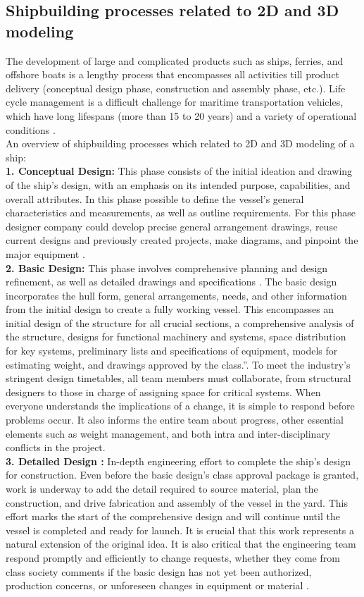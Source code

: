 \subsection{Shipbuilding processes related to 2D and 3D modeling}
The development of large and complicated products such as ships, ferries, and offshore boats is a lengthy process that encompasses all activities till product delivery (conceptual design phase, construction and assembly phase, etc.).  Life cycle management is a difficult challenge for maritime transportation vehicles, which have long lifespans (more than 15 to 20 years) and a variety of operational conditions \cite{Favi2018}. \\ An overview of shipbuilding processes which related to 2D and 3D modeling of a ship: \\
\textbf{1. Conceptual Design:}  This phase consists of the initial ideation and drawing of the ship's design, with an emphasis on its intended purpose, capabilities, and overall attributes. In this phase possible to define the vessel's general characteristics and measurements, as well as outline requirements. For this phase designer company could develop precise general arrangement drawings, reuse current designs and previously created projects, make diagrams, and pinpoint the major equipment \cite{Favi2018}.\\
\textbf{2. Basic Design:} This phase involves comprehensive planning and design refinement, as well as detailed drawings and specifications \cite{Favi2018}. The basic design incorporates the hull form, general arrangements, needs, and other information from the initial design to create a fully working vessel. This encompasses an initial design of the structure for all crucial sections, a comprehensive analysis of the structure, designs for functional machinery and systems, space distribution for key systems, preliminary lists and specifications of equipment, models for estimating weight, and drawings approved by the class.”. To meet the industry's stringent design timetables, all team members must collaborate, from structural designers to those in charge of assigning space for critical systems. When everyone understands the implications of a change, it is simple to respond before problems occur. It also informs the entire team about progress, other essential elements such as weight management, and both intra and inter-disciplinary conflicts in the project\cite{Thedesignphase}.\\
\textbf{3. Detailed Design :}
In-depth engineering effort to complete the ship's design for construction. Even before the basic design's class approval package is granted, work is underway to add the detail required to source material, plan the construction, and drive fabrication and assembly of the vessel in the yard. This effort marks the start of the comprehensive design and will continue until the vessel is completed and ready for launch. It is crucial that this work represents a natural extension of the original idea. It is also critical that the engineering team respond promptly and efficiently to change requests, whether they come from class society comments if the basic design has not yet been authorized, production concerns, or unforeseen changes in equipment or material \cite{Thedesignphase}.\\
